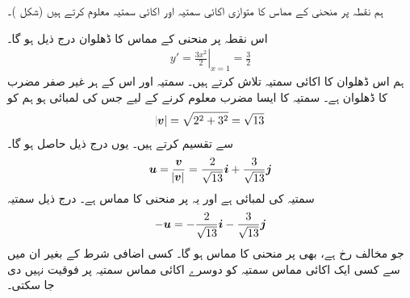 ہم نقطہ  پر منحنی کے مماس کا متوازی  اکائی سمتیہ اور اکائی    سمتیہ معلوم کرتے ہیں (شکل )۔

اس نقطہ پر منحنی کے مماس کا ڈھلوان درج ذیل ہو گا۔
\begin{align*}
y'=\left.\frac{3x^2}{2}\right\vert_{x=1}=\frac{3}{2}
\end{align*}
ہم اس ڈھلوان کا اکائی سمتیہ تلاش کرتے ہیں۔ سمتیہ  اور اس کے ہر غیر صفر مضرب کا ڈھلوان  ہے۔ سمتیہ   کا ایسا مضرب معلوم کرنے کے لیے جس کی لمبائی  ہو ہم  کو 
\begin{align*}
\abs{{{\boldsymbol{v}}}}=\sqrt{2^2+3^2}=\sqrt{13}
\end{align*}
سے تقسیم کرتے ہیں۔ یوں درج ذیل حاصل ہو گا۔
\begin{align*}
{\ensuremath{{\boldsymbol{u}}}}=\frac{{{\boldsymbol{v}}}}{\abs{{{\boldsymbol{v}}}}}=\frac{2}{\sqrt{13}}{\boldsymbol{i}}+\frac{3}{\sqrt{13}}{\boldsymbol{j}}
\end{align*}
سمتیہ  کی لمبائی  ہے اور یہ  پر منحنی کا مماس ہے۔ درج ذیل سمتیہ
\begin{align*}
-{{\boldsymbol{u}}}=-\frac{2}{\sqrt{13}}{\boldsymbol{i}}-\frac{3}{\sqrt{13}}{\boldsymbol{j}}
\end{align*}
جو مخالف  رخ ہے،  بھی  پر منحنی کا مماس ہو گا۔ کسی اضافی شرط کے بغیر ان میں سے کسی ایک اکائی مماس سمتیہ کو دوسرے  اکائی مماس سمتیہ پر فوقیت نہیں دی جا سکتی۔

